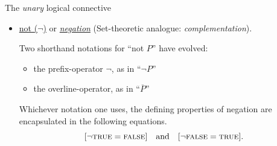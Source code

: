 \medskip

 {\small\sf The {\em unary} logical connective}
\begin{itemize}
\item
\underline{{\sc not} ($\neg$)} or \underline{\it negation}
\hspace*{.1in}
{\small\sf (Set-theoretic analogue: {\em complementation})}.

\smallskip

Two shorthand notations for ``{\sc not} $P$'' have evolved:
  \begin{itemize}
  \item
the prefix-operator $\neg$, as in ``$\neg P$''
  \item
the overline-operator, as in ``$\overline{P}$''
  \end{itemize}
Whichever notation one uses, the defining properties of negation are encapsulated in the following equations.
\[
[\neg \mbox{\sc true} = \mbox{\sc false}] \ \ \mbox{ and } \ \ [\neg
  \mbox{\sc false} = \mbox{\sc true}].
\]
\end{itemize}

\medskip

